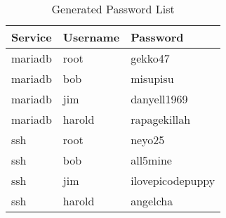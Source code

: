 \begin{table}[h!]
\centering
\begin{tabularx}{0.5\textwidth}{|>{\raggedright\arraybackslash}X|>{\raggedright\arraybackslash}X|>{\raggedright\arraybackslash}X|}
\hline
\textbf{Service} & \textbf{Username} & \textbf{Password} \\
\hline
mariadb & root    & gekko47        \\
mariadb & bob     & misupisu       \\
mariadb & jim     & danyell1969    \\
mariadb & harold  & rapagekillah   \\
ssh     & root    & neyo25         \\
ssh     & bob     & all5mine       \\
ssh     & jim     & ilovepicodepuppy \\
ssh     & harold  & angelcha       \\
\hline
\end{tabularx}
\caption{Generated Password List}
\label{tab:envtools}
\end{table}
